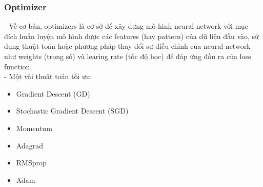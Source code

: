 \subsubsection{Optimizer}
- Về cơ bản, optimizers là cơ sở để xây dựng mô hình neural network với mục đích huấn luyện mô hình được các features (hay pattern) của dữ liệu đầu vào, sử dụng thuật toán hoặc phương pháp thay đổi sự điều chỉnh của neural network như weights (trọng số) và learing rate (tốc độ học) để đáp ứng đầu ra của loss function.
\\- Một vài thuật toán tối ưu:
\begin{itemize}
    \item Gradient Descent (GD)
    \item Stochastic Gradient Descent (SGD)
    \item Momentum
    \item Adagrad
    \item RMSprop
    \item Adam
\end{itemize}

